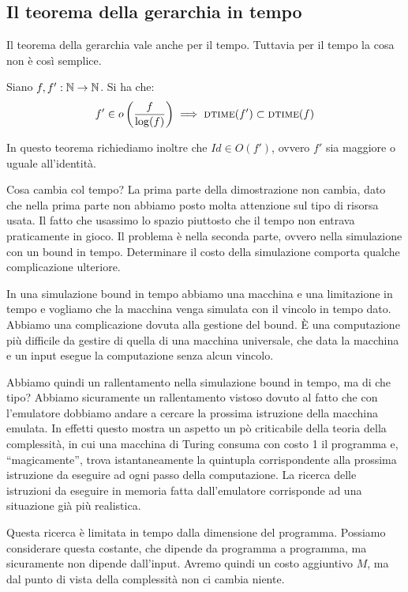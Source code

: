 \subsection{Il teorema della gerarchia in tempo}

Il teorema della gerarchia vale anche per il tempo. Tuttavia per il tempo la cosa non è così
semplice.

\begin{thm}
    Siano $f,f':\mathbb{N} \to \mathbb{N}$. Si ha che:
    \begin{equation*}
        f' \in o\left(\frac{f}{\log(f)}\right) \implies \textsc{dtime}(f') \subset \textsc{dtime}(f)
    \end{equation*}
\end{thm}

In questo teorema richiediamo inoltre che $\textit{Id} \in O(f')$, ovvero $f'$ sia maggiore o uguale
all'identità.

Cosa cambia col tempo? La prima parte della dimostrazione non cambia, dato che nella prima parte non
abbiamo posto molta attenzione sul tipo di risorsa usata. Il fatto che usassimo lo spazio piuttosto
che il tempo non entrava praticamente in gioco. Il problema è nella seconda parte, ovvero
nella simulazione con un bound in tempo. Determinare il costo della simulazione comporta qualche
complicazione ulteriore.

In una simulazione bound in tempo abbiamo una macchina e una limitazione in tempo e vogliamo che la
macchina venga simulata con il vincolo in tempo dato. Abbiamo una complicazione dovuta alla gestione
del bound. È una computazione più difficile da gestire di quella di una macchina universale, che
data la macchina e un input esegue la computazione senza alcun vincolo.

Abbiamo quindi un rallentamento nella simulazione bound in tempo, ma di che tipo? Abbiamo
sicuramente un rallentamento vistoso dovuto al fatto che con l'emulatore dobbiamo andare a cercare
la prossima istruzione della macchina emulata. In effetti questo mostra un aspetto un pò
criticabile della teoria della complessità, in cui una macchina di Turing consuma con costo 1 il
programma e, ``magicamente'', trova istantaneamente la quintupla corrispondente alla prossima
istruzione da eseguire ad ogni passo della computazione. La ricerca delle istruzioni da eseguire in
memoria fatta dall'emulatore corrisponde ad una situazione già più realistica.

Questa ricerca è limitata in tempo dalla dimensione del programma. Possiamo considerare questa
costante, che dipende da programma a programma, ma sicuramente non dipende dall'input. Avremo quindi
un costo aggiuntivo $M$, ma dal punto di vista della complessità non ci cambia niente.

